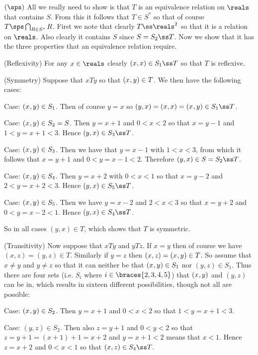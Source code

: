 {{    $(\sps)$ All we really need to show is that $T$ is an equivalence relation on $\reals$ that contains $S$.
    From this it follows that $T \in S^*$ so that of course $T \sps \bigcap_{R \in S^*} R$.
    First we note that clearly $T \ss \reals^2$ so that it is a relation on $\reals$.
    Also clearly it contains $S$ since $S = S_2 \ss T$.
    Now we show that it has the three properties that an equivalence relation require.

    (Reflexivity) For any $x \in \reals$ clearly $(x,x) \in S_1 \ss T$ so that $T$ is reflexive.

    (Symmetry) Suppose that $xTy$ so that $(x_{}, y_{}) \in T$.
    We then have the following cases:

    Case: $(x_{}, y_{}) \in S_1$.
    Then of course $y = x$ so $(y,x) = (x,x) = \ppt{} \in S_1 \ss T$.

    Case: $(x_{}, y_{}) \in S_2 = S$.
    Then $y = x+1$ and $0<x<2$ so that $x = y-1$ and $1 < y=x+1 < 3$.
    Hence $(y,x) \in S_3 \ss T$.

    Case: $(x_{}, y_{}) \in S_3$.
    Then we have that $y = x - 1$ with $1 < x < 3$, from which it follows that $x = y + 1$ and $0 < y = x-1 < 2$.
    Therefore $(y,x) \in S = S_2 \ss T$.

    Case: $(x_{}, y_{}) \in S_4$.
    Then $y = x+2$ with $0 < x < 1$ so that $x = y-2$ and $2 < y=x+2 < 3$.
    Hence $(y,x) \in S_5 \ss T$.

    Case: $(x_{}, y_{}) \in S_5$.
    Then we have $y = x-2$ and $2 < x < 3$ so that $x = y+2$ and $0 < y=x-2 < 1$.
    Hence $(y,x) \in S_4 \ss T$.

    So in all cases $(y,x) \in T$, which shows that $T$ is symmetric.

    (Transitivity) Now suppose that $xTy$ and $yTz$.
    If $x = y$ then of course we have $(x,z) = (y,z) \in T$.
    Similarly if $y = z$ then $(x,z) = (x_{}, y_{}) \in T$.
    So assume that $x \neq y$ and $y \neq z$ so that it can neither be that $(x_{}, y_{}) \in S_1$ nor $(y,z) \in S_1$.
    Thus there are four sets (i.e. $S_i$ where $i \in \braces{2,3,4,5}$) that $(x_{}, y_{})$ and $(y,z)$ can be in, which results in sixteen different possibilities, though not all are possible:

    Case: $(x_{}, y_{}) \in S_2$.
    Then $y=x+1$ and $0 < x < 2$ so that $1 < y = x+1 < 3$.
    \begin{indpar}
      Case: $(y,z) \in S_2$.
      Then also $z=y+1$ and $0 < y < 2$ so that $z = y+1 = (x+1)+1 = x+2$ and $y = x+1 < 2$ means that $x < 1$.
      Hence $z = x+2$ and $0 < x < 1$ so that $(x,z) \in S_4 \ss T$.


\end{indpar}}}
